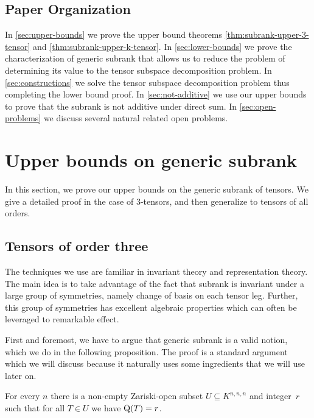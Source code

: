 \documentclass[10pt,a4paper]{article}
\theoremstyle{definition}
\theoremstyle{remark}
\newcommand{\subrank}{{\rm Q}}
\begin{document}
\subsection{Paper Organization}

In \autoref{sec:upper-bounds} we prove the upper bound theorems \autoref{thm:subrank-upper-3-tensor} and \autoref{thm:subrank-upper-k-tensor}. In \autoref{sec:lower-bounds} we prove the characterization of generic subrank that allows us to reduce the problem of determining its value to the tensor subspace decomposition problem. In \autoref{sec:constructions} we solve the tensor subspace decomposition problem thus completing the lower bound proof. 
In \autoref{sec:not-additive} we use our upper bounds to prove that the subrank is not additive under direct sum.
In \autoref{sec:open-problems} we discuss several natural related open problems.

\newpage


\section{Upper bounds on generic subrank}\label{sec:upper-bounds}
In this section, we prove our upper bounds on the generic subrank of tensors. We give a detailed proof in the case of $3$-tensors, and then generalize to tensors of all orders.

\subsection{Tensors of order three}

The techniques we use are familiar in invariant theory and representation theory. The main idea is to take advantage of the fact that subrank is invariant under a large group of symmetries, namely change of basis on each tensor leg. Further, this group of symmetries has excellent algebraic properties which can often be leveraged to remarkable effect. 


First and foremost, we have to argue that generic subrank is a valid notion, which we do in the following proposition. The proof is a standard argument which we will discuss because it naturally uses some ingredients that we will use later on.
\begin{proposition}\label{prop:gen-subrank-exists}
For every $n$ there is a non-empty Zariski-open subset $U \subseteq K^{n,n,n}$ and integer~$r$ such that for all $T \in U$ we have $\subrank(T) = r$.
\end{proposition}
\end{document}

